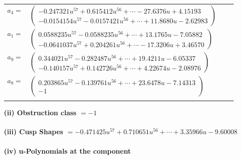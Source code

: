 \documentclass[1p]{elsarticle_modified}
\theoremstyle{definition}
\begin{document}
\begin{tabular}{m{7pt} m{180pt} m{7pt} m{180pt} }
\flushright $a_{4}=$&$\begin{pmatrix}-0.247321 u^{57}+0.615412 u^{56}+\cdots-27.6376 u+4.15193\\-0.0154154 u^{57}-0.0157421 u^{56}+\cdots+11.8680 u-2.62983\end{pmatrix}$ \\
\flushright $a_{1}=$&$\begin{pmatrix}0.0588235 u^{57}-0.0588235 u^{56}+\cdots+13.1765 u-7.05882\\-0.0641037 u^{57}+0.204261 u^{56}+\cdots-17.3206 u+3.46570\end{pmatrix}$ \\
\flushright $a_{9}=$&$\begin{pmatrix}0.344021 u^{57}-0.282487 u^{56}+\cdots+19.4211 u-6.05337\\-0.140157 u^{57}+0.142726 u^{56}+\cdots+4.22674 u-2.08976\end{pmatrix}$ \\
\flushright $a_{8}=$&$\begin{pmatrix}0.203865 u^{57}-0.139761 u^{56}+\cdots+23.6478 u-7.14313\\-1\end{pmatrix}$\\&\end{tabular}
\flushleft \textbf{(ii) Obstruction class $= -1$}\\~\\
\flushleft \textbf{(iii) Cusp Shapes $= -0.471425 u^{57}+0.710651 u^{56}+\cdots+3.35966 u-9.60008$}\\~\\
\newpage\renewcommand{\arraystretch}{1}
\flushleft \textbf{(iv) u-Polynomials at the component}\newline \\
\end{document}
